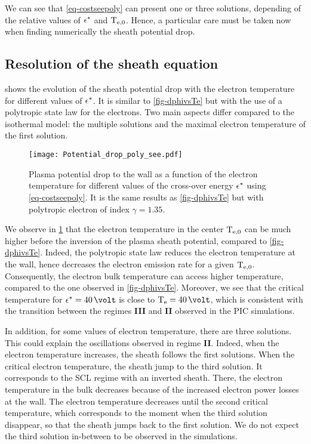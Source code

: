 We can see that \cref{eq-costseepoly} can present one or three solutions, depending of the relative values of $\epsilon^{*}$ and $\mathrm{T_{e, 0}}$.
Hence, a particular care must be taken now when finding numerically the sheath potential drop.

\subsection{Resolution of the sheath equation} \label{subsec-def_sheat_see}


 shows the evolution of the sheath potential drop with the electron temperature for different values of $\epsilon^{*}$.
It is similar to \cref{fig-dphivsTe} but with the use of a polytropic state law for the electrons.
Two main aspects differ compared to the isothermal model\string: the multiple solutions and the maximal electron temperature of the first solution.

\begin{figure}[hbtp]
  \centering
  \texttt{[image: Potential\_drop\_poly\_see.pdf]}
  \caption{ Plasma potential drop to the wall as a function of the electron temperature for different values of the cross-over energy $\epsilon^{*}$ using \cref{eq-costseepoly}. It is the same results as  \cref{fig-dphivsTe} but with polytropic electron of index $\gamma=1.35$.}
  \label{fig-rso_crit_see}
\end{figure}

We observe in \cref{fig-rso_crit_see} that the electron temperature in the center $\mathrm{T_{e, 0}}$ can be much higher before the inversion of the plasma sheath potential, compared to \cref{fig-dphivsTe}.
Indeed, the polytropic state law reduces the electron temperature at the wall, hence decreases the electron emission rate for a given $\mathrm{T_{e, 0}}$.
Consequently, the electron bulk temperature can access higher temperature, compared to the one observed in \cref{fig-dphivsTe}.
Moreover, we see that the critical temperature for $\crover=40 \,\volt$ is close to $\Te=40\,\volt$, which is consistent with the transition between the regimes {\bf III} and {\bf II} observed in the \ac{PIC} simulations.

In addition, for some values of electron temperature, there are three solutions.
This could explain the oscillations observed in regime {\bf II}.
Indeed, when the electron temperature increases, the sheath follows the first solutions.
When the critical electron temperature, the sheath jump to the third solution.
It corresponds to the \ac{SCL} regime with an inverted sheath.
There, the electron temperature in the bulk decreases because of the increased electron power losses at the wall.
The electron temperature decreases until the second critical temperature, which corresponds to the moment when the third solution disappear, so that the sheath jumps back to the first solution.
We do not expect the third solution in-between to be observed in the simulations.

